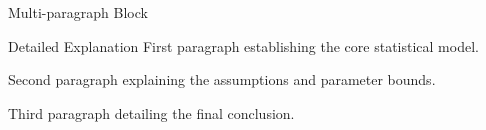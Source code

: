 \documentclass[14pt,t]{beamer-accessibility}
\begin{document}
\begin{frame}{Multi-paragraph Block}
\begin{block}{Detailed Explanation}
First paragraph establishing the core statistical model.

Second paragraph explaining the assumptions and parameter bounds.

Third paragraph detailing the final conclusion.
\end{block}
\end{frame}
\end{document}
